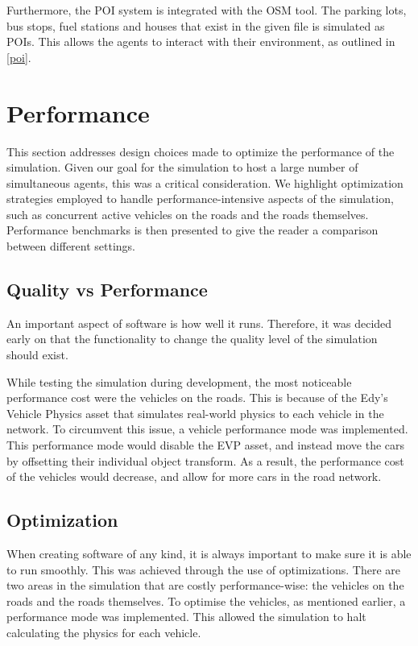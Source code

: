 
        Furthermore, the POI system is integrated with the OSM tool. The parking lots, bus stops, fuel stations and houses that exist in the given file is simulated as POIs. This allows the agents to interact with their environment, as outlined in \ref{poi}.


\section{Performance}
    This section addresses design choices made to optimize the performance of the simulation. Given our goal for the simulation to host a large number of simultaneous agents, this was a critical consideration. We highlight optimization strategies employed to handle performance-intensive aspects of the simulation, such as concurrent active vehicles on the roads and the roads themselves. Performance benchmarks is then presented to give the reader a comparison between different settings. 

    \subsection{Quality vs Performance}
        An important aspect of software is how well it runs. Therefore, it was decided early on that the functionality to change the quality level of the simulation should exist. 
    
        While testing the simulation during development, the most noticeable performance cost were the vehicles on the roads. This is because of the Edy's Vehicle Physics asset that simulates real-world physics to each vehicle in the network. To circumvent this issue, a vehicle performance mode was implemented. This performance mode would disable the EVP asset, and instead move the cars by offsetting their individual object transform. As a result, the performance cost of the vehicles would decrease, and allow for more cars in the road network.
    
    \subsection{Optimization} 
        When creating software of any kind, it is always important to make sure it is able to run smoothly. This was achieved through the use of optimizations. There are two areas in the simulation that are costly performance-wise: the vehicles on the roads and the roads themselves. To optimise the vehicles, as mentioned earlier, a performance mode was implemented. This allowed the simulation to halt calculating the physics for each vehicle. 
    
